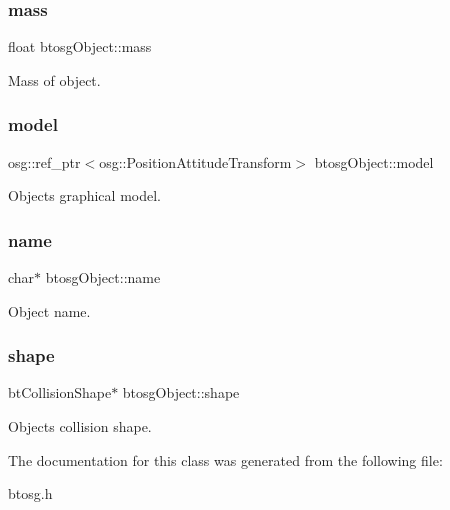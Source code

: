 \mbox{\label{classbtosgObject_a2418bb2194d5e9b0f1c51c84672ba7d1}} 
\subsubsection{\texorpdfstring{mass}{mass}}
{\footnotesize\ttfamily float btosg\+Object\+::mass\hspace{0.3cm}{\ttfamily [inherited]}}



Mass of object. 

\mbox{\label{classbtosgObject_afd15726e7a214212d6d5815f8ac1ac6c}} 
\subsubsection{\texorpdfstring{model}{model}}
{\footnotesize\ttfamily osg\+::ref\+\_\+ptr$<$osg\+::\+Position\+Attitude\+Transform$>$ btosg\+Object\+::model\hspace{0.3cm}{\ttfamily [inherited]}}



Object\textquotesingle{}s graphical model. 

\mbox{\label{classbtosgObject_a12396e1362797a75473a2e833b579cc9}} 
\subsubsection{\texorpdfstring{name}{name}}
{\footnotesize\ttfamily char$\ast$ btosg\+Object\+::name\hspace{0.3cm}{\ttfamily [inherited]}}



Object name. 

\mbox{\label{classbtosgObject_a0f6a8da01cf643c321bffe86e42604b0}} 
\subsubsection{\texorpdfstring{shape}{shape}}
{\footnotesize\ttfamily bt\+Collision\+Shape$\ast$ btosg\+Object\+::shape\hspace{0.3cm}{\ttfamily [inherited]}}



Object\textquotesingle{}s collision shape. 



The documentation for this class was generated from the following file\+:\begin{DoxyCompactItemize}
\item 
btosg.\+h\end{DoxyCompactItemize}

